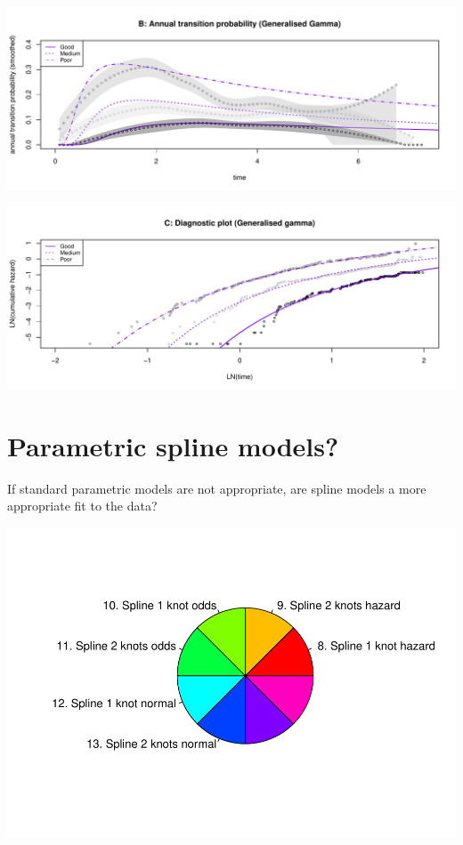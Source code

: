 \documentclass[]{article}
\begin{document}
\begin{flushleft}\includegraphics[height=0.3\textheight]{images/ggam-2} \end{flushleft}

\begin{flushleft}\includegraphics[height=0.3\textheight]{images/ggam-3} \end{flushleft}

\newpage

\section{Parametric spline models?}\label{parametric-spline-models}

If standard parametric models are not appropriate, are spline models a
more appropriate fit to the data?

\begin{flushleft}\includegraphics{images/spline-1} \end{flushleft}
\end{document}
